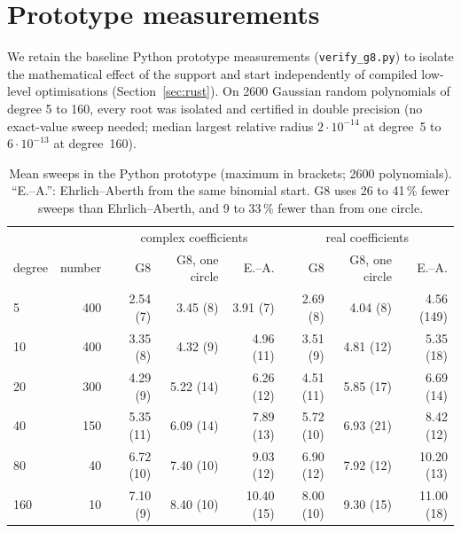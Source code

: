 \documentclass[10pt,a4paper]{article}
\theoremstyle{definition}
\numberwithin{equation}{section}
\begin{document}
\section{Prototype measurements}\label{sec:meas}
We retain the baseline Python prototype measurements (\texttt{verify\_g8.py}) to isolate the mathematical effect of the support and start independently of compiled low-level optimisations (Section~\ref{sec:rust}). On 2600 Gaussian random polynomials of degree 5 to 160, every root was isolated and certified in double precision (no exact-value sweep needed; median largest relative radius $2\cdot10^{-14}$ at degree~5 to $6\cdot10^{-13}$ at degree~160).

\begin{table}[H]\centering\small\setlength{\tabcolsep}{4.5pt}
\begin{tabular}{lr@{\quad}rrr@{\qquad}rrr}
\toprule
 & & \multicolumn{3}{c}{complex coefficients} & \multicolumn{3}{c}{real coefficients}\\
degree & number & G8 & G8, one circle & E.--A. & G8 & G8, one circle & E.--A.\\
\midrule
5 & 400 & 2.54 (7) & 3.45 (8) & 3.91 (7) & 2.69 (8) & 4.04 (8) & 4.56 (149)\\
10 & 400 & 3.35 (8) & 4.32 (9) & 4.96 (11) & 3.51 (9) & 4.81 (12) & 5.35 (18)\\
20 & 300 & 4.29 (9) & 5.22 (14) & 6.26 (12) & 4.51 (11) & 5.85 (17) & 6.69 (14)\\
40 & 150 & 5.35 (11) & 6.09 (14) & 7.89 (13) & 5.72 (10) & 6.93 (21) & 8.42 (12)\\
80 & 40 & 6.72 (10) & 7.40 (10) & 9.03 (12) & 6.90 (12) & 7.92 (12) & 10.20 (13)\\
160 & 10 & 7.10 (9) & 8.40 (10) & 10.40 (15) & 8.00 (10) & 9.30 (15) & 11.00 (18)\\
\bottomrule
\end{tabular}
\caption{Mean sweeps in the Python prototype (maximum in brackets; 2600 polynomials). ``E.--A.'': Ehrlich--Aberth from the same binomial start. G8 uses 26 to 41\,\% fewer sweeps than Ehrlich--Aberth, and 9 to 33\,\% fewer than from one circle.}\label{tab:random}
\end{table}
\end{document}

